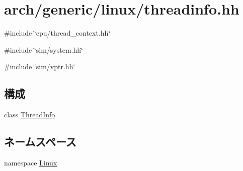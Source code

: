 \hypertarget{threadinfo_8hh}{
\section{arch/generic/linux/threadinfo.hh}
\label{threadinfo_8hh}
}
{\ttfamily \#include \char`\"{}cpu/thread\_\-context.hh\char`\"{}}\par
{\ttfamily \#include \char`\"{}sim/system.hh\char`\"{}}\par
{\ttfamily \#include \char`\"{}sim/vptr.hh\char`\"{}}\par
\subsection*{構成}
\begin{DoxyCompactItemize}
\item 
class \hyperlink{classLinux_1_1ThreadInfo}{ThreadInfo}
\end{DoxyCompactItemize}
\subsection*{ネームスペース}
\begin{DoxyCompactItemize}
\item 
namespace \hyperlink{namespaceLinux}{Linux}
\end{DoxyCompactItemize}
